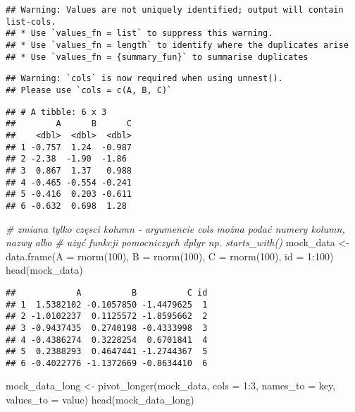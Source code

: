 \documentclass[
]{book}
\newenvironment{Shaded}{\begin{snugshade}}{\end{snugshade}}
\newcommand{\AttributeTok}[1]{\textcolor[rgb]{0.77,0.63,0.00}{#1}}
\newcommand{\CommentTok}[1]{\textcolor[rgb]{0.56,0.35,0.01}{\textit{#1}}}
\newcommand{\DecValTok}[1]{\textcolor[rgb]{0.00,0.00,0.81}{#1}}
\newcommand{\FunctionTok}[1]{\textcolor[rgb]{0.00,0.00,0.00}{#1}}
\newcommand{\NormalTok}[1]{#1}
\newcommand{\OtherTok}[1]{\textcolor[rgb]{0.56,0.35,0.01}{#1}}
\newcommand{\SpecialCharTok}[1]{\textcolor[rgb]{0.00,0.00,0.00}{#1}}
\newcommand{\StringTok}[1]{\textcolor[rgb]{0.31,0.60,0.02}{#1}}
\begin{document}
\begin{verbatim}
## Warning: Values are not uniquely identified; output will contain list-cols.
## * Use `values_fn = list` to suppress this warning.
## * Use `values_fn = length` to identify where the duplicates arise
## * Use `values_fn = {summary_fun}` to summarise duplicates
\end{verbatim}

\begin{verbatim}
## Warning: `cols` is now required when using unnest().
## Please use `cols = c(A, B, C)`
\end{verbatim}

\begin{verbatim}
## # A tibble: 6 x 3
##        A      B      C
##    <dbl>  <dbl>  <dbl>
## 1 -0.757  1.24  -0.987
## 2 -2.38  -1.90  -1.86 
## 3  0.867  1.37   0.988
## 4 -0.465 -0.554 -0.241
## 5 -0.416  0.203 -0.611
## 6 -0.632  0.698  1.28
\end{verbatim}

\begin{Shaded}
\begin{Highlighting}[]
\CommentTok{\# zmiana tylko częsci kolumn {-} argumencie cols można podać numery kolumn, nazwy albo }
\CommentTok{\# użyć funkcji pomocniczych dplyr np. starts\_with()}
\NormalTok{mock\_data }\OtherTok{\textless{}{-}} \FunctionTok{data.frame}\NormalTok{(}\AttributeTok{A =} \FunctionTok{rnorm}\NormalTok{(}\DecValTok{100}\NormalTok{), }\AttributeTok{B =} \FunctionTok{rnorm}\NormalTok{(}\DecValTok{100}\NormalTok{), }\AttributeTok{C =} \FunctionTok{rnorm}\NormalTok{(}\DecValTok{100}\NormalTok{), }\AttributeTok{id =} \DecValTok{1}\SpecialCharTok{:}\DecValTok{100}\NormalTok{)}
\FunctionTok{head}\NormalTok{(mock\_data)}
\end{Highlighting}
\end{Shaded}

\begin{verbatim}
##            A          B          C id
## 1  1.5382102 -0.1057850 -1.4479625  1
## 2 -1.0102237  0.1125572 -1.8595662  2
## 3 -0.9437435  0.2740198 -0.4333998  3
## 4 -0.4386274  0.3228254  0.6701841  4
## 5  0.2388293  0.4647441 -1.2744367  5
## 6 -0.4022776 -1.1372669 -0.8634410  6
\end{verbatim}

\begin{Shaded}
\begin{Highlighting}[]
\NormalTok{mock\_data\_long }\OtherTok{\textless{}{-}} \FunctionTok{pivot\_longer}\NormalTok{(mock\_data, }\AttributeTok{cols =} \DecValTok{1}\SpecialCharTok{:}\DecValTok{3}\NormalTok{, }\AttributeTok{names\_to =} \StringTok{\textquotesingle{}key\textquotesingle{}}\NormalTok{, }\AttributeTok{values\_to =} \StringTok{\textquotesingle{}value\textquotesingle{}}\NormalTok{)}
\FunctionTok{head}\NormalTok{(mock\_data\_long)}
\end{Highlighting}
\end{Shaded}
\end{document}
